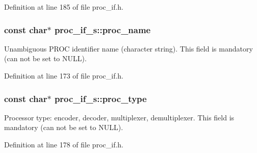 Definition at line 185 of file proc\+\_\+if.\+h.

\subsubsection[{\texorpdfstring{proc\+\_\+name}{proc_name}}]{\setlength{\rightskip}{0pt plus 5cm}const char$\ast$ proc\+\_\+if\+\_\+s\+::proc\+\_\+name}\hypertarget{structproc__if__s_aa284f1d0bdde2fae0b51101f658430ee}{}\label{structproc__if__s_aa284f1d0bdde2fae0b51101f658430ee}
Unambiguous P\+R\+OC identifier name (character string). This field is mandatory (can not be set to N\+U\+LL). 

Definition at line 173 of file proc\+\_\+if.\+h.

\subsubsection[{\texorpdfstring{proc\+\_\+type}{proc_type}}]{\setlength{\rightskip}{0pt plus 5cm}const char$\ast$ proc\+\_\+if\+\_\+s\+::proc\+\_\+type}\hypertarget{structproc__if__s_a3a8a04d2e81ca4dfa55a8526644dd729}{}\label{structproc__if__s_a3a8a04d2e81ca4dfa55a8526644dd729}
Processor type\+: encoder, decoder, multiplexer, demultiplexer. This field is mandatory (can not be set to N\+U\+LL). 

Definition at line 178 of file proc\+\_\+if.\+h.

